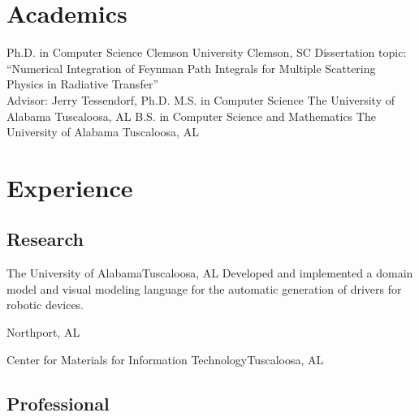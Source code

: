 \documentclass[11pt]{moderncv}
\begin{document}
\makecvtitle
\vspace{-2.5\baselineskip}

\section{Academics}

        {Ph.D. in Computer Science}
        {Clemson University}
        {Clemson, SC}
        {}
        {
    Dissertation topic: ``Numerical Integration of Feynman Path Integrals for
    Multiple Scattering Physics in Radiative Transfer'' \\
    Advisor: Jerry Tessendorf, Ph.D.
}
        {M.S. in Computer Science}
        {The University of Alabama}
        {Tuscaloosa, AL}
        {}{}
        {B.S. in Computer Science and Mathematics}
        {The University of Alabama}
        {Tuscaloosa, AL}
        {}{}

\section{Experience}

\subsection{Research}


        {The University of Alabama}{Tuscaloosa, AL}{}{
  Developed and implemented a domain model and visual modeling language for the
  automatic generation of drivers for robotic devices.
}

        {Northport, AL}{}{}

        {Center for Materials for Information Technology}{Tuscaloosa, AL}{}{}

\subsection{Professional}
\end{document}
